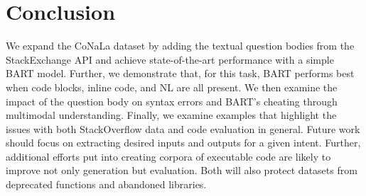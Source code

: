\documentclass[11pt]{article}
\begin{document}
\section{Conclusion}
We expand the CoNaLa dataset by adding the textual question bodies from the StackExchange API and achieve state-of-the-art performance with a simple BART model. Further, we demonstrate that, for this task, BART performs best when code blocks, inline code, and NL are all present. We then examine the impact of the question body on syntax errors and BART's cheating through multimodal understanding. Finally, we examine examples that highlight the issues with both StackOverflow data and code evaluation in general. Future work should focus on extracting desired inputs and outputs for a given intent. Further, additional efforts put into creating corpora of executable code are likely to improve not only generation but evaluation. Both will also protect datasets from deprecated functions and abandoned libraries.    




\appendix
\end{document}
